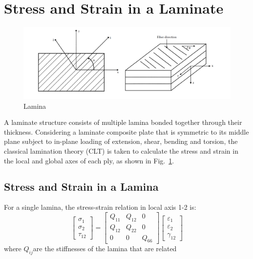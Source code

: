 \documentclass[USenglish,twocolumn]{article}
\begin{document}
\section{Stress and Strain in a Laminate}
\begin{figure}[!htb]
	\centering
	\includegraphics[width=\linewidth]{A_laminate_design_images/lamina_local_global_axes.png}
\caption{Lamina}
  	\label{fig:lamina}
\end{figure}
A laminate structure consists of multiple lamina bonded together through their thickness.
Considering a laminate composite plate that is symmetric to its middle plane subject to in-plane
loading of extension, shear, bending and torsion, the classical lamination theory (CLT) is taken to
calculate the stress and strain in the local and global axes of each ply, as shown in
Fig.~\ref{fig:lamina}.




\subsection{Stress and Strain in a Lamina}
For a single lamina, the stress-strain relation in local axis 1-2 is:
\begin{equation}
    \begin{bmatrix}
        \sigma _1\\
        \sigma _2\\
        \tau_{12}
    \end{bmatrix}
    =
    \begin{bmatrix}
        Q_{11} & Q_{12} & 0\\
        Q_{12} & Q_{22} & 0\\
        0      &  0     & Q_{66}
    \end{bmatrix}
    \begin{bmatrix}
        \varepsilon_1\\
        \varepsilon_2\\\gamma_{12}
    \end{bmatrix}
\end{equation}
where $Q_{ij} $are the stiffnesses of the lamina that are related
\end{document}

